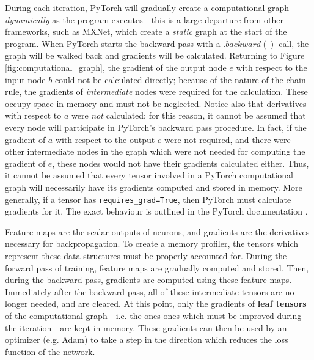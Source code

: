 \documentclass[12pt,letterpaper]{article}
\begin{document}
During each iteration, PyTorch will gradually create a computational graph \textit{dynamically} as the program executes - this is a large departure from other frameworks, such as MXNet, which create a \textit{static} graph at the start of the program. When PyTorch starts the backward pass with a $.backward()$ call, the graph will be walked back and gradients will be calculated. Returning to Figure \ref{fig:computational_graph}, the gradient of the output node $e$ with respect to the input node $b$ could not be calculated directly; because of the nature of the chain rule, the gradients of \textit{intermediate} nodes were required for the calculation. These occupy space in memory and must not be neglected. Notice also that derivatives with respect to $a$ were \textit{not} calculated; for this reason, it cannot be assumed that every node will participate in PyTorch's backward pass procedure. In fact, if the gradient of $a$ with respect to the output $e$ were not required, and there were other intermediate nodes in the graph which were not needed for computing the gradient of $e$, these nodes would not have their gradients calculated either. Thus, it cannot be assumed that every tensor involved in a PyTorch computational graph will necessarily have its gradients computed and stored in memory. More generally, if a tensor has \texttt{requires\_grad=True}, then PyTorch must calculate gradients for it. The exact behaviour is outlined in the PyTorch documentation \cite{pytorch_doc_leaf_requires_grad}. 
\par 

Feature maps are the scalar outputs of neurons, and gradients are the derivatives necessary for backpropagation. To create a memory profiler, the tensors which represent these data structures must be properly accounted for. During the forward pass of training, feature maps are gradually computed and stored. Then, during the backward pass, gradients are computed using these feature maps. Immediately after the backward pass, all of these intermediate tensors are no longer needed, and are cleared. At this point, only the gradients of \textbf{leaf tensors} \cite{pytorch_doc_leaf_requires_grad} of the computational graph - i.e. the ones ones which must be improved during the iteration - are kept in memory. These gradients can then be used by an optimizer (e.g. Adam) to take a step in the direction which reduces the loss function of the network.
\par 
\end{document}
